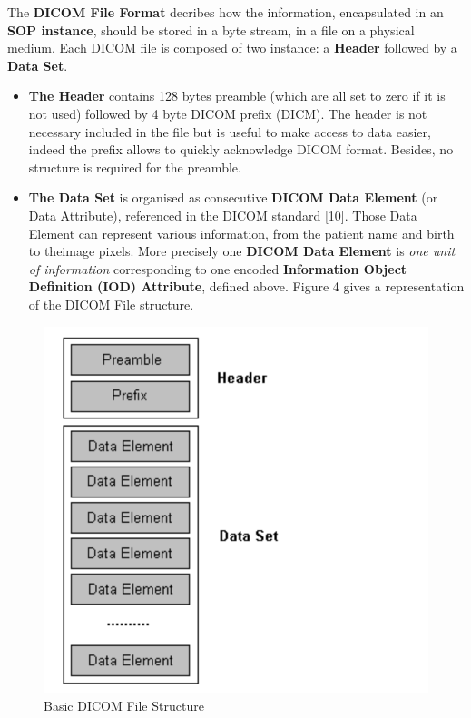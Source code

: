The \textbf{DICOM File Format} decribes how the information, encapsulated in an  \textbf{SOP instance}, should be stored in a byte stream, in a file on a physical medium. Each DICOM file is composed of two instance: a \textbf{Header} followed by a \textbf{Data Set}.

\begin{itemize} 
\item \textbf{The Header} contains 128 bytes preamble (which are all set to zero if it is not used) followed by 4 byte DICOM prefix (DICM). The header is not necessary included in the file but is useful to make access to data easier, indeed the prefix allows to quickly acknowledge DICOM format. Besides, no structure is required for the preamble.  

\item \textbf{The Data Set} is organised as consecutive \textbf{DICOM Data Element} (or Data Attribute), referenced in the DICOM standard [10]. Those Data Element can represent various information, from the patient name and birth to theimage pixels. More precisely one \textbf{DICOM Data Element} is \textit{one unit of information} corresponding to one encoded \textbf{Information Object Definition (IOD) Attribute}, defined above. Figure 4 gives a representation of the DICOM File structure.
\end{itemize}

\begin{figure}[ht]
\centering
\includegraphics[width = 0.45\hsize]{./figures/DicomFileFormat}
\caption{Basic DICOM File Structure}
\end{figure}

